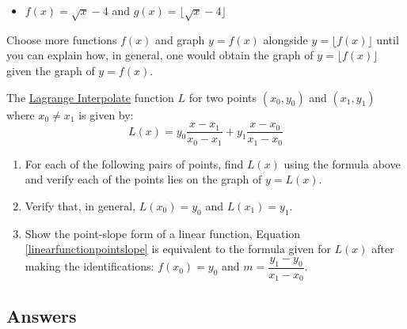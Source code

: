 \begin{exenum}
\begin{itemize}
\item  $f(x) = \sqrt{x}-4$ and $g(x) = \lfloor \sqrt{x} -4  \rfloor$

\end{itemize}

Choose more functions $f(x)$ and graph $y = f(x)$ alongside $y = \lfloor f(x) \rfloor$ until you can explain how, in general, one would obtain the graph of $y = \lfloor f(x) \rfloor$ given the graph of $y = f(x)$.

\item \label{LagrangeLinearExercise} The \href{https://en.wikipedia.org/wiki/Lagrange_polynomial}{\underline{Lagrange Interpolate}} function $L$ for two points $(x_{0}, y_{0})$ and $(x_{1}, y_{1})$ where $x_{0} \neq x_{1}$  is given by: \[L(x) = y_{0}  \dfrac{x - x_{1}}{x_{0} - x_{1}}+ y_{1}\dfrac{x - x_{0}}{x_{1} - x_{0}}\]

\begin{enumerate}

\item For each of the following pairs of points,  find  $L(x)$ using the formula above and verify each of the points lies on the graph of $y = L(x)$.


\item  Verify that, in general, $L(x_{0}) = y_{0}$ and $L(x_{1}) = y_{1}$.

\item  Show the point-slope form of a linear function, Equation \ref{linearfunctionpointslope} is equivalent to the formula given for $L(x)$ after making the identifications:  $f(x_{0}) = y_{0}$ and $m = \dfrac{y_{1} - y_{0}}{x_{1} - x_{0}}$.

\end{enumerate}

\end{exenum}


\clearpage

\subsection{Answers}

